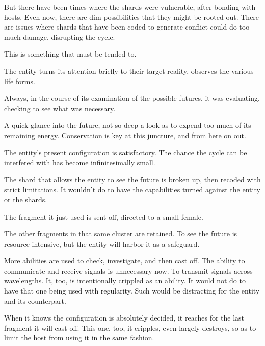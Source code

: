 But there have been times where the shards were vulnerable, after bonding with hosts.  Even now, there are dim possibilities that they might be rooted out.  There are issues where shards that have been coded to generate conflict could do too much damage, disrupting the cycle.



This is something that must be tended to.



The entity turns its attention briefly to their target reality, observes the various life forms.



Always, in the course of its examination of the possible futures, it was evaluating, checking to see what was necessary.



A quick glance into the future, not so deep a look as to expend too much of its remaining energy.  Conservation is key at this juncture, and from here on out.



The entity's present configuration is satisfactory.  The chance the cycle can be interfered with has become infinitesimally small.



The shard that allows the entity to see the future is broken up, then recoded with strict limitations.  It wouldn't do to have the capabilities turned against the entity or the shards.



The fragment it just used is sent off, directed to a small female.



The other fragments in that same cluster are retained.  To see the future is resource intensive, but the entity will harbor it as a safeguard.



More abilities are used to check, investigate, and then cast off.   The ability to communicate and receive signals is unnecessary now.  To transmit signals across wavelengths.  It, too, is intentionally crippled as an ability.  It would not do to have that one being used with regularity.  Such would be distracting for the entity and its counterpart.



When it knows the configuration is absolutely decided, it reaches for the last fragment it will cast off.  This one, too, it cripples, even largely destroys, so as to limit the host from using it in the same fashion.



